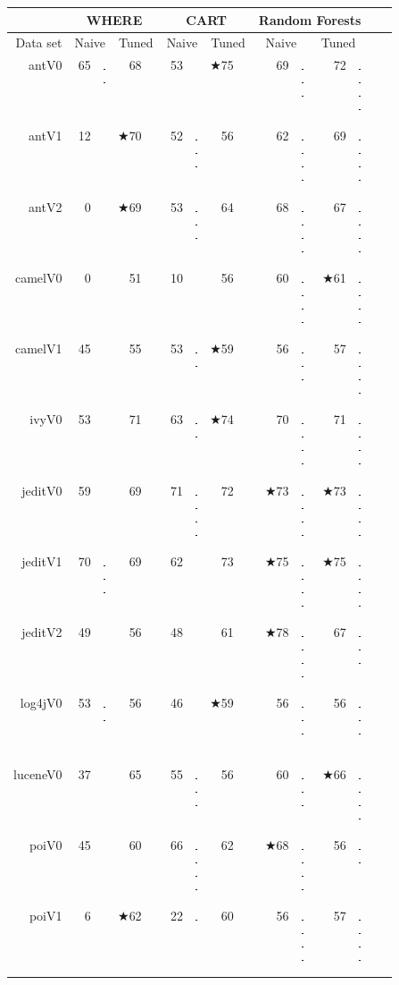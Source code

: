 \documentclass{acm_proc_article-sp}
\newcommand{\crule}[3][darkgray]{\textcolor{#1}{\rule{#2}{#3}}}
\newcommand{\rone}{\crule{1mm}{1.95mm}}
\newcommand{\rtwo}{\crule{1mm}{1.95mm}\hspace{0.3pt}\crule{1mm}{1.95mm}}
\newcommand{\rthree}{\crule{1mm}{1.95mm}\hspace{0.3pt}\crule{1mm}{1.95mm}\hspace{0.3pt}\crule{1mm}{1.95mm}}
\newcommand{\rfour}{\crule{1mm}{1.95mm}\hspace{0.3pt}\crule{1mm}{1.95mm}\hspace{0.3pt}\crule{1mm}{1.95mm}\hspace{0.3pt}\crule{1mm}{1.95mm}}
\begin{document}
\begin{figure}
\renewcommand{\baselinestretch}{0.8} 

\scriptsize  
\begin{tabular}{r|r@{~}l@{~}|r@{~}l|r@{~}l|r@{~}l|r@{~}l@{~}|r@{~}l@{~}r@{~}l}
      &   \multicolumn{4}{c|}{WHERE}         &   \multicolumn{4}{c|}{CART}         &   \multicolumn{4}{c}{Random Forests}         \\\hline
  Data set   &   \multicolumn{2}{c}{Naive}         &   \multicolumn{2}{c|}{Tuned}         &   \multicolumn{2}{c}{Naive}         &   \multicolumn{2}{c|}{Tuned}    &   \multicolumn{2}{c}{Naive}  &   \multicolumn{2}{c}{Tuned}\\\hline
antV0 & 65 & {\rtwo} & 68 & {\rthree} & 53 &         & $\bigstar$75 & {\rfour} & 69 & {\rthree} & 72 & {\rfour}\\
antV1 & 12 &         & $\bigstar$70 & {\rfour} & 52 & {\rthree} & 56 & {\rthree} & 62 & {\rfour} & 69 & {\rfour}\\
antV2 & 0 &         & $\bigstar$69 & {\rfour} & 53 & {\rthree} & 64 & {\rfour} & 68 & {\rfour} & 67 & {\rfour}\\
camelV0 & 0 &         & 51 & {\rfour} & 10 &         & 56 & {\rfour} & 60 & {\rfour} & $\bigstar$61 & {\rfour}\\
camelV1 & 45 &         & 55 & {\rthree} & 53 & {\rtwo} & $\bigstar$59 & {\rfour} & 56 & {\rthree} & 57 & {\rfour}\\
ivyV0 & 53 &         & 71 & {\rfour} & 63 & {\rtwo} & $\bigstar$74 & {\rfour} & 70 & {\rfour} & 71 & {\rfour}\\
jeditV0 & 59 &         & 69 & {\rthree} & 71 & {\rfour} & 72 & {\rfour} & $\bigstar$73 & {\rfour} & $\bigstar$73 & {\rfour}\\
jeditV1 & 70 & {\rthree} & 69 & {\rtwo} & 62 &         & 73 & {\rfour} & $\bigstar$75 & {\rfour} & $\bigstar$75 & {\rfour}\\
jeditV2 & 49 &         & 56 & {\rone} & 48 &         & 61 & {\rtwo} & $\bigstar$78 & {\rfour} & 67 & {\rthree}\\
log4jV0 & 53 & {\rtwo} & 56 & {\rthree} & 46 &         & $\bigstar$59 & {\rfour} & 56 & {\rthree} & 56 & {\rthree}\\
luceneV0 & 37 &         & 65 & {\rfour} & 55 & {\rthree} & 56 & {\rthree} & 60 & {\rthree} & $\bigstar$66 & {\rfour}\\
poiV0 & 45 &         & 60 & {\rthree} & 66 & {\rfour} & 62 & {\rthree} & $\bigstar$68 & {\rfour} & 56 & {\rtwo}\\
poiV1 & 6 &         & $\bigstar$62 & {\rfour} & 22 & {\rone} & 60 & {\rfour} & 56 & {\rfour} & 57 & {\rfour}\\

\end{tabular}
\end{figure}
\end{document}
